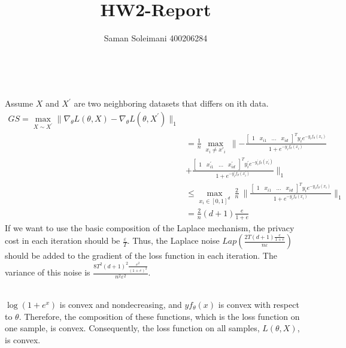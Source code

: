\documentclass[12pt]{extarticle}
\title{\textbf{HW2-Report}}
\author{Saman Soleimani 400206284}
\date{}
\begin{document}
\\
 Assume $X$ and $X^{'}$ are two neighboring datasets that differs on ith data.
\begin{align*}
	GS = \underset{X\sim X^{'}}{\max} \lVert \nabla_\theta  L(\theta, X) - \nabla_\theta L(\theta, X^{'})\rVert_1 \\ 
	& = \frac{1}{n}\ \underset{x_i \neq x'_i}{\max}\ \lVert -\frac{\begin{bmatrix}
		 1 & x_{i1} & \dots & x_{id}
	\end{bmatrix}^T y_i e^{-y_i f_\theta(x_i)}}{1+e^{-y_i f_\theta(x_i)}}\\
	&+\frac{\begin{bmatrix}
		1 & x^{'}_{i1} & \dots & x^{'}_{id}
	\end{bmatrix}^T y^{'}_i e^{-y^{'}_i f_\theta(x^{'}_i)}}{1+e^{-y^{'}_i f_\theta(x^{'}_i)}} \rVert_1 \\
	&\le  \underset{x_i \in [0,1]^d}{\max}\  \frac{2}{n}\ \lVert \frac{\begin{bmatrix}
			1 & x_{i1} & \dots & x_{id}
		\end{bmatrix}^T y_i e^{-y_i f_\theta(x_i)}}{1+e^{-y_i f_\theta(x_i)}}\rVert_1  \\
	& = \frac{2}{n}(d+1)\frac{e}{1+e}
\end{align*}
If we want to use the basic composition of the Laplace mechanism, the privacy cost in each iteration should be $\frac{\varepsilon}{T}$. Thus, the Laplace noise $Lap\left(\frac{2T(d+1)\frac{e}{1+e}}{n\varepsilon}\right)$ should be added to the gradient of the loss function in each iteration. The variance of this noise is $\frac{8T^2(d+1)^2 \frac{e^2}{(1+e)^2}}{n^2\varepsilon^2}$.\\\\
\(\log(1+e^x)\) is convex and nondecreasing, and \(y f_\theta(x)\) is convex with respect to \(\theta\). Therefore, the composition of these functions, which is the loss function on one sample, is convex. Consequently, the loss function on all samples, \(L(\theta,X)\), is convex.
\end{document}
